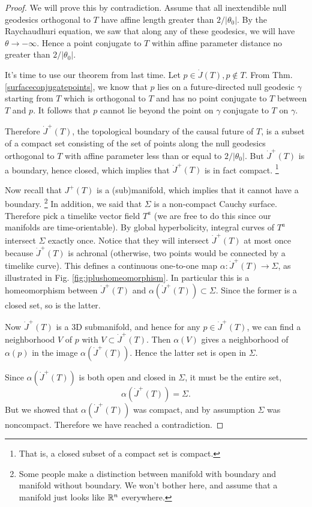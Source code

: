 \begin{proof}
    We will prove this by contradiction. Assume that all inextendible null geodesics orthogonal to $T$ have affine length greater than $2/|\theta_0|$. By the Raychaudhuri equation, we saw that along any of these geodesics, we will have $\theta\to-\infty$. Hence a point conjugate to $T$ within affine parameter distance no greater than $2/|\theta_0|$.
    
    It's time to use our theorem from last time. Let $p\in \dot J(T), p \notin T$. From Thm. \ref{surfaceconjugatepoints}, we know that $p$ lies on a future-directed null geodesic $\gamma$ starting from $T$ which is orthogonal to $T$ and has no point conjugate to $T$ between $T$ and $p$. It follows that $p$ cannot lie beyond the point on $\gamma$ conjugate to $T$ on $\gamma$.
    
    Therefore $\dot J^+(T)$, the topological boundary of the causal future of $T$, is a subset of a compact set consisting of the set of points along the null geodesics orthogonal to $T$ with affine parameter less than or equal to $2/|\theta_0|$. But $\dot J^+(T)$ is a boundary, hence closed, which implies that $\dot J^+(T)$ is in fact compact.%
        \footnote{That is, a closed subset of a compact set is compact.}
    
    Now recall that $J^+(T)$ is a (sub)manifold, which implies that it cannot have a boundary.%
        \footnote{Some people make a distinction between manifold with boundary and manifold without boundary. We won't bother here, and assume that a manifold just looks like $\mathbb{R}^n$ everywhere.}
    In addition, we said that $\Sigma$ is a non-compact Cauchy surface. Therefore pick a timelike vector field $T^a$ (we are free to do this since our manifolds are time-orientable). By global hyperbolicity, integral curves of $T^a$ intersect $\Sigma$ exactly once. Notice that they will intersect $\dot J^+(T)$ at most once because $\dot J^+(T)$ is achronal (otherwise, two points would be connected by a timelike curve). This defines a continuous one-to-one map $\alpha:\dot J^+(T) \to \Sigma$, as illustrated in Fig. \ref{fig:jplushomeomorphism}. In particular this is a homeomorphism between $\dot J^+(T)$ and $\alpha(\dot J^+(T))\subset \Sigma$. Since the former is a closed set, so is the latter.
    
    Now $\dot J^+(T)$ is a 3D submanifold, and hence for any $p\in \dot J^+(T)$, we can find a neighborhood $V$ of $p$ with $V\subset \dot J^+(T)$. Then $\alpha(V)$ gives a neighborhood of $\alpha(p)$ in the image $\alpha(\dot J^+(T))$. Hence the latter set is open in $\Sigma$.
    
    Since $\alpha(\dot J^+(T))$ is both open and closed in $\Sigma$, it must be the entire set,
    \begin{equation*}
        \alpha(\dot J^+(T))=\Sigma.
    \end{equation*}
    But we showed that $\alpha(\dot J^+(T))$ was compact, and by assumption $\Sigma$ was noncompact. Therefore we have reached a contradiction.
\end{proof}


